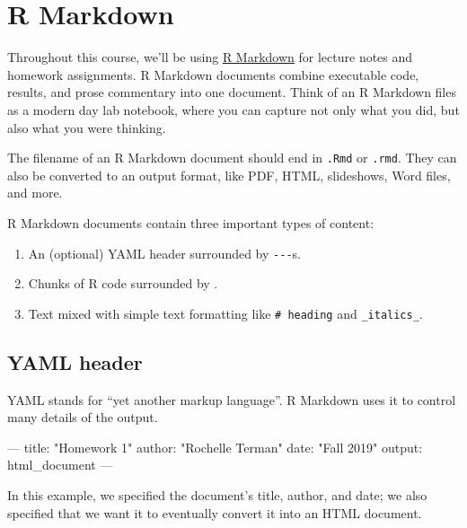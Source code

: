 \documentclass[]{book}
\newenvironment{Shaded}{\begin{snugshade}}{\end{snugshade}}
\newcommand{\NormalTok}[1]{#1}
\providecommand{\tightlist}{%
  \setlength{\itemsep}{0pt}\setlength{\parskip}{0pt}}
\begin{document}
\hypertarget{r-markdown}{\section{R Markdown}\label{r-markdown}}

Throughout this course, we'll be using
\href{http://rmarkdown.rstudio.com\%3E}{R Markdown} for lecture notes
and homework assignments. R Markdown documents combine executable code,
results, and prose commentary into one document. Think of an R Markdown
files as a modern day lab notebook, where you can capture not only what
you did, but also what you were thinking.

The filename of an R Markdown document should end in \texttt{.Rmd} or
\texttt{.rmd}. They can also be converted to an output format, like PDF,
HTML, slideshows, Word files, and more.

R Markdown documents contain three important types of content:

\begin{enumerate}
\def\labelenumi{\arabic{enumi}.}
\tightlist
\item
  An (optional) YAML header surrounded by \texttt{-\/-\/-}s.
\item
  Chunks of R code surrounded by
  \texttt{\textasciigrave{}\textasciigrave{}\textasciigrave{}}.
\item
  Text mixed with simple text formatting like \texttt{\#\ heading} and
  \texttt{\_italics\_}.
\end{enumerate}

\subsection{YAML header}\label{yaml-header}

YAML stands for ``yet another markup language''. R Markdown uses it to
control many details of the output.

\begin{Shaded}
\begin{Highlighting}[]
\NormalTok{---}
\NormalTok{title: "Homework 1"}
\NormalTok{author: "Rochelle Terman"}
\NormalTok{date: "Fall 2019"}
\NormalTok{output: html_document}
\NormalTok{---}
\end{Highlighting}
\end{Shaded}

In this example, we specified the document's title, author, and date; we
also specified that we want it to eventually convert it into an HTML
document.
\end{document}
